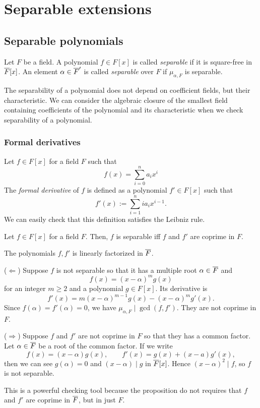 \documentclass{../exp}
\begin{document}
\section{Separable extensions}

\subsection{Separable polynomials}
\begin{defn}
Let $F$ be a field.
A polynomial $f\in F[x]$ is called \emph{separable} if it is square-free in $\overline F[x]$.
An element $\alpha\in\overline F'$ is called \emph{separable} over $F$ if $\mu_{\alpha,F}$ is separable.
\end{defn}

The separability of a polynomial does not depend on coefficient fields, but their characteristic.
We can consider the algebraic closure of the smallest field containing coefficients of the polynomial and its characteristic when we check separability of a polynomial.


\subsubsection{Formal derivatives}
\begin{defn}
Let $f\in F[x]$ for a field $F$ such that
\[f(x)=\sum_{i=0}^na_ix^i\]
The \emph{formal derivative} of $f$ is defined as a polynomial $f'\in F[x]$ such that
\[f'(x):=\sum_{i=1}^nia_ix^{i-1}.\]
We can easily check that this definition satisfies the Leibniz rule.
\end{defn}

\begin{prop}
Let $f\in F[x]$ for a field $F$.
Then, $f$ is separable iff $f$ and $f'$ are coprime in $F$.
\end{prop}
\begin{pf}
The polynomials $f,f'$ is linearly factorized in $\overline F$.

($\Leftarrow$)
Suppose $f$ is not separable so that it has a multiple root $\alpha\in\overline F$ and
\[f(x)=(x-\alpha)^mg(x)\]
for an integer $m\ge2$ and a polynomial $g\in F[x]$.
Its derivative is
\[f'(x)=m(x-\alpha)^{m-1}g(x)-(x-\alpha)^mg'(x).\]
Since $f(\alpha)=f'(\alpha)=0$, we have $\mu_{\alpha,F}\mid\gcd(f,f')$.
They are not coprime in $F$.

($\Rightarrow$)
Suppose $f$ and $f'$ are not coprime in $F$ so that they has a common factor.
Let $\alpha\in\overline F$ be a root of the common factor.
If we write
\[f(x)=(x-\alpha)g(x),\qquad f'(x)=g(x)+(x-a)g'(x),\]
then we can see $g(\alpha)=0$ and $(x-\alpha)\mid g$ in $\overline F[x]$.
Hence $(x-\alpha)^2\mid f$, so $f$ is not separable.
\end{pf}
\begin{rmk}
This is a powerful checking tool because the proposition do not requires that $f$ and $f'$ are coprime in $\overline F$, but in just $F$.
\end{rmk}
\end{document}
